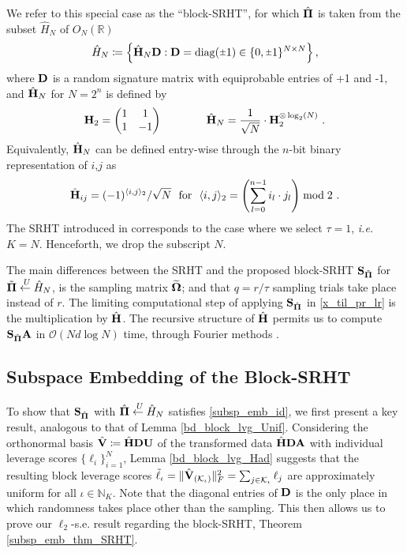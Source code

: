 \documentclass[journal,letterpaper,onecolumn,twoside,nofonttune]{IEEEtran}
\newcommand{\ow}{\mathcal{O}}
\newcommand{\K}{\mathcal{K}}
\newcommand{\Ub}{\bold{U}}
\newcommand{\Pibold}{\bold{\Pi}}
\newcommand{\Pibh}{\hat{\Pibold}}
\newcommand{\Pibt}{\tilde{\Pibold}}
\newcommand{\Omb}{\bold{\Omega}}
\newcommand{\Ombwt}{\widetilde{\Omb}}
\newcommand{\R}{\mathbb{R}}
\newcommand{\N}{\mathbb{N}}
\newcommand{\Sb}{\bold{S}}
\newcommand{\SbPh}{\Sb_{\Pibh}}
\newcommand{\SbPt}{\Sb_{\Pibt}}
\newcommand{\Ab}{\bold{A}}
\newcommand{\Db}{\bold{D}}
\newcommand{\Hb}{\bold{H}}
\newcommand{\Hbh}{\hat{\bold{H}}}
\newcommand{\Vbh}{\hat{\bold{V}}}
\newcommand{\rpm}{\raisebox{.2ex}{$\scriptstyle\pm$}}
\newcommand{\getsU}{\overset{\ U}{\gets}}
\newcommand{\diag}{\mathrm{diag}}
\begin{document}
We refer to this special case as the ``block-SRHT'', for which $\Pibh$ is taken from the subset $\hat{H}_N$ of $O_N(\R)$%
\begin{equation}
\label{set_Had}  %
  \hat{H}_N\coloneqq\left\{\Hbh_N\Db : \Db=\diag(\rpm1)\in\{0,\rpm1\}^{N\times N}\right\},
\end{equation}
where $\Db$ is a random signature matrix with equiprobable entries of +1 and -1, and $\Hbh_N$ for $N=2^n$ is defined by
$$ \Hb_2 = \begin{pmatrix} 1 & 1 \\ 1 & -1 \end{pmatrix} \qquad \qquad \Hbh_N = \frac{1}{\sqrt{N}}\cdot\Hb_2^{\otimes \log_2(N)}\ .$$
Equivalently, $\Hbh_N$ can be defined entry-wise through the $n$-bit binary representation of $i$,$j$ as 
$$ \Hbh_{ij}=(-1)^{\langle i,j\rangle_2}/\sqrt{N} \ \text{ for } \ \langle i,j\rangle_2 = \left(\sum_{l=0}^{n-1}i_l\cdot j_l\right)\bmod2\ . $$
The SRHT introduced in \cite{DMMS11} corresponds to the case where we select $\tau=1$, \textit{i.e.} $K=N$. Henceforth, we drop the subscript $N$.

The main differences between the SRHT and the proposed block-SRHT $\SbPt$ for $\Pibt\getsU \hat{H}_N$, is the sampling matrix $\Ombwt$; and that $q=r/\tau$ sampling trials take place instead of $r$. The limiting computational step of applying $\SbPh$ in \eqref{x_til_pr_lr} is the multiplication by $\Hbh$. The recursive structure of $\Hbh$ permits us to compute $\SbPh\Ab$ in $\ow(Nd\log N)$ time, through Fourier methods \cite{Osg09}.

\subsection{Subspace Embedding of the Block-SRHT}

To show that $\SbPh$ with $\Pibh\getsU \hat{H}_N$ satisfies \eqref{subsp_emb_id}, we first present a key result, analogous to that of Lemma \ref{bd_block_lvg_Unif}. Considering the orthonormal basis $\Vbh\coloneqq\Hbh\Db\Ub$ of the transformed data $\Hbh\Db\Ab$ with individual leverage scores $\{\ell_i\}_{i=1}^N$, Lemma \ref{bd_block_lvg_Had} suggests that the resulting block leverage scores $\tilde{\ell}_\iota=\|\Vbh_{(\K_\iota)}\|_F^2=\sum_{j\in\K_\iota}\ell_j$ are approximately uniform for all $\iota\in\N_K$. Note that the diagonal entries of $\Db$ is the only place in which randomness takes place other than the sampling. This then allows us to prove our $\ell_2$-s.e. result regarding the block-SRHT, Theorem \ref{subsp_emb_thm_SRHT}.
\end{document}
